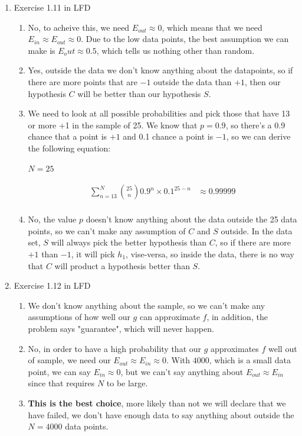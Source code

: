 \documentclass{article}
\begin{document}
\begin{enumerate}
        \item Exercise 1.11 in LFD
        \begin{enumerate}[label=(\alph*)]
            \item No, to acheive this, we need $E_{out} \approx 0$, which means that we need $E_{in} \approx E_{out} \approx 0$. Due to the low data points, the best assumption we can make is $E_out \approx 0.5$, which tells us nothing other than random.
            \item Yes, outside the data we don't know anything about the datapoints, so if there are more points that are $-1$ outside the data than $+1$, then our hypothesis $C$ will be better than our hypothesis $S$.
            \item We need to look at all possible probabilities and pick those that have 13 or more +1 in the sample of 25. We know that $p=0.9$, so there's a 0.9 chance that a point is $+1$ and 0.1 chance a point is $-1$, so we can derive the following equation:
            \begin{center}
                $N = 25$\\
            \end{center}
            \begin{align*}
                \sum_{n=13}^N {25 \choose n} 0.9^n \times 0.1^{25-n} &\approx 0.99999\\
            \end{align*}
            \item No, the value $p$ doesn't know anything about the data outside the 25 data points, so we can't make any assumption of $C$ and $S$ outside. In the data set, $S$ will always pick the better hypothesis than $C$, so if there are more $+1$ than $-1$, it will pick $h_1$, vise-versa, so inside the data, there is no way that $C$ will product a hypothesis better than $S$.
        \end{enumerate}

        \item Exercise 1.12 in LFD
        \begin{enumerate}[label=(\alph*)]
            \item We don't know anything about the sample, so we can't make any assumptions of how well our $g$ can approximate $f$, in addition, the problem says "guarantee", which will never happen.
            \item No, in order to have a high probability that our $g$ approximates $f$ well out of sample, we need our $E_{out} \approx E_{in} \approx 0$. With $4000$, which is a small data point, we can say $E_{in} \approx 0$, but we can't say anything about $E_{out} \approx E_{in}$ since that requires $N$ to be large.
            \item \textbf{This is the best choice}, more likely than not we will declare that we have failed, we don't have enough data to say anything about outside the $N = 4000$ data points.
        \end{enumerate}


\end{enumerate}
\end{document}
